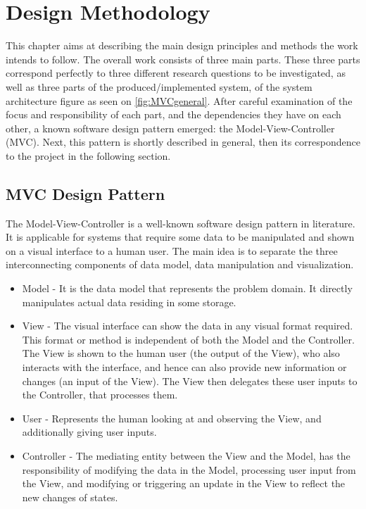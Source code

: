 \chapter{Design Methodology}

This chapter aims at describing the main design principles and methods the work intends to follow. The overall work consists of three main parts. These three parts correspond perfectly to three different research questions to be investigated, as well as three parts of the produced/implemented system, of the system architecture figure as seen on \ref{fig:MVCgeneral}. After careful examination of the focus and responsibility of each part, and the dependencies they have on each other, a known software design pattern emerged: the Model-View-Controller (MVC). Next, this pattern is shortly described in general, then its correspondence to the project in the following section. 

\section{MVC Design Pattern}
The Model-View-Controller is a well-known software design pattern in literature. It is applicable for systems that require some data to be manipulated and shown on a visual interface to a human user. The main idea is to separate the three interconnecting components of data model, data manipulation and visualization.
\begin{itemize}
\item Model - It is the data model that represents the problem domain. It directly manipulates actual data residing in some storage. 
\item View - The visual interface can show the data in any visual format required. This format or method is independent of both the Model and the Controller. The View is shown to the human user (the output of the View), who also interacts with the interface, and hence can also provide new information or changes (an input of the View). The View then delegates these user inputs to the Controller, that processes them. 
\item User - Represents the human looking at and observing the View, and additionally giving user inputs.
\item Controller - The mediating entity between the View and the Model, has the responsibility of modifying the data in the Model, processing user input from the View, and modifying or triggering an update in the View to reflect the new changes of states.

\end{itemize}


  
  